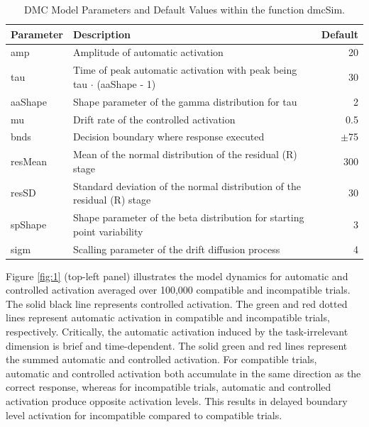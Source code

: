 \begin{table}
    \centering
    \caption{DMC Model Parameters and Default Values within the function dmcSim.}
    \begin{tabular}{llr}
        \hline
        Parameter & Description & Default \\ 
        \hline
        amp     & Amplitude of automatic activation                                            &  20     \\ 
        tau     & Time of peak automatic activation with peak being tau $\cdot$ (aaShape - 1)  &  30     \\ 
        aaShape & Shape parameter of the gamma distribution for tau                            &   2     \\ 
        mu      & Drift rate of the controlled activation                                      &   0.5   \\ 
        bnds    & Decision boundary where response executed                                    & $\pm$75 \\ 
        resMean & Mean of the normal distribution of the residual (R) stage                    & 300     \\ 
        resSD   & Standard deviation of the normal distribution of the residual (R) stage      &  30     \\ 
        spShape & Shape parameter of the beta distribution for starting point variability      &   3     \\ 
        sigm    & Scalling parameter of the drift diffusion process                            &   4     \\ 
        \hline
    \end{tabular}
    \label{tab:dmc_sim_parameters}
\end{table}

Figure \ref{fig:1} (top-left panel) illustrates the model dynamics for
automatic and controlled activation averaged over 100,000 compatible and
incompatible trials. The solid black line represents controlled activation. The
green and red dotted lines represent automatic activation in compatible and
incompatible trials, respectively. Critically, the automatic activation induced
by the task-irrelevant dimension is brief and time-dependent. The solid green
and red lines represent the summed automatic and controlled activation. For
compatible trials, automatic and controlled activation both accumulate in the
same direction as the correct response, whereas for incompatible trials,
automatic and controlled activation produce opposite activation levels. This
results in delayed boundary level activation for incompatible compared to
compatible trials.

